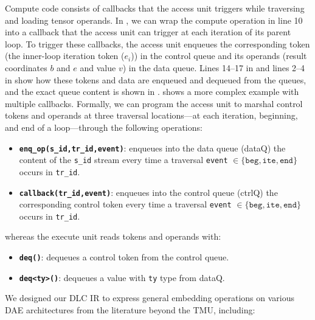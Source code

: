 Compute code consists of callbacks that the access unit triggers while traversing and loading tensor operands. In , we can wrap the compute operation in line 10 into a callback that the access unit can trigger at each iteration of its parent loop. To trigger these callbacks, the access unit enqueues the corresponding token (the inner-loop iteration token ($e_i$)) in the control queue and its operands (result coordinates $b$ and $e$ and value $v$) in the data queue. Lines 14--17 in  and lines 2--4 in  show how these tokens and data are enqueued and dequeued from the queues, and the exact queue content is shown in .  shows a more complex example with multiple callbacks. Formally, we can program the access unit to marshal control tokens and operands at three traversal locations---at each iteration, beginning, and end of a loop---through the following operations:
\begin{itemize}
    \item \textbf{\texttt{enq\_op(s\_id,tr\_id,event)}}: enqueues into the data queue (dataQ) the content of the \texttt{s\_id} stream every time a traversal \texttt{event} $\in \{ \texttt{beg}, \texttt{ite}, \texttt{end} \}$ occurs in \texttt{tr\_id}.
    \item \textbf{\texttt{callback(tr\_id,event)}}: enqueues into the control queue (ctrlQ) the corresponding control token every time a traversal \texttt{event} $\in \{ \texttt{beg}, \texttt{ite}, \texttt{end} \}$ occurs in \texttt{tr\_id}.
\end{itemize}
whereas the execute unit reads tokens and operands with:
\begin{itemize}
    \item \textbf{\texttt{deq()}}: dequeues a control token from the control queue.
    \item \textbf{\texttt{deq<ty>()}}: dequeues a value with \texttt{ty} type from dataQ.
\end{itemize}
We designed our DLC IR to express general embedding operations on various DAE architectures from the literature beyond the TMU, including:
